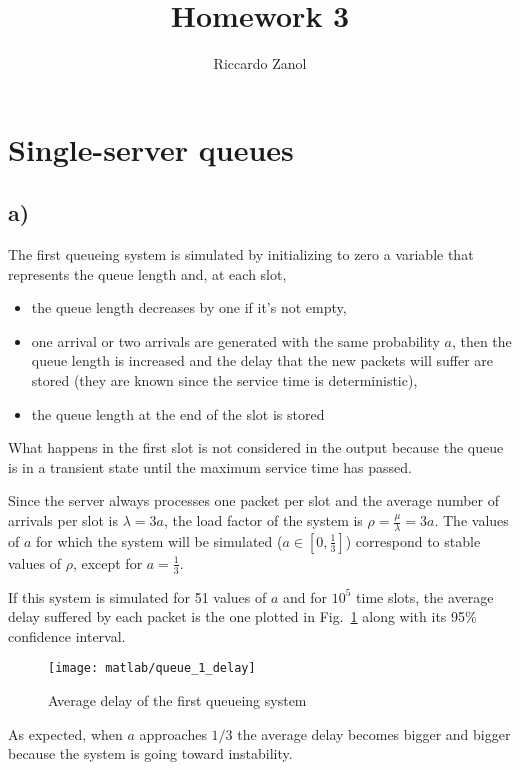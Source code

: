 \documentclass[a4paper,oneside]{article}
\author{Riccardo Zanol}
\title{Homework 3}
\begin{document}
\matlabcodeconfig
\maketitle
\section{Single-server queues}
\subsection*{a)}
The first queueing system is simulated by initializing to zero a
variable that represents the queue length and, at each slot,
\begin{itemize}
\item the queue length decreases by one if it's not empty,
  \item one arrival or two arrivals are generated with the same
    probability $a$, then the queue length is increased and the delay
    that the new packets will suffer are stored (they are known since
    the service time is deterministic),
  \item the queue length at the end of the slot is stored
\end{itemize}
What happens in the first slot is not considered in the output because
the queue is in a transient state until the maximum service time has
passed.

Since the server always processes one packet per slot and the average
number of arrivals per slot is $\lambda = 3a$, the load factor of the
system is $\rho = \frac{\mu}{\lambda} = 3a$. The values of $a$ for
which the system will be simulated ($ a \in [0, \frac{1}{3}]$)
correspond to stable values of $\rho$, except for $a=\frac{1}{3}$.

If this system is simulated for 51 values of $a$ and for $10^5$ time
slots, the average delay suffered by each packet is the one plotted in
Fig.~\ref{plot:queue1_delay} along with its 95\% confidence
interval.
\begin{figure}[htbp]
  \centering
    \texttt{[image: matlab/queue\_1\_delay]}
    \caption{Average delay of the first queueing system}
    \label{plot:queue1_delay}
\end{figure}
As expected, when $a$ approaches $1/3$ the average delay becomes
bigger and bigger because the system is going toward instability.
\end{document}
